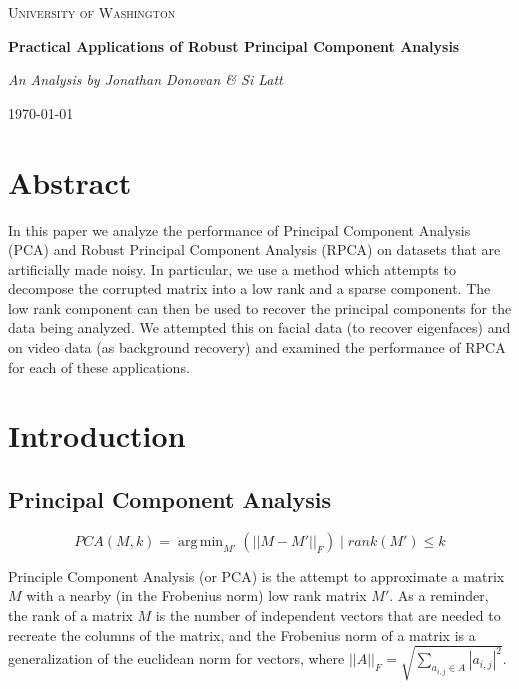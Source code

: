 \documentclass[11pt]{scrartcl} %
\DeclareMathOperator*{\argmin}{arg\,min}
\theoremstyle{plain}
\begin{document}
\begin{titlepage}
	\centering
	{\scshape\LARGE University of Washington\par}
	\vspace{1.5cm}
	{\huge\bfseries Practical Applications of Robust Principal Component Analysis\par}
	\vspace{2cm}
	{\Large\itshape  An Analysis by Jonathan Donovan \& Si Latt\par}

	\vfill

	{\large \today\par}
\end{titlepage}


\section{Abstract}
In this paper we analyze the performance of Principal Component Analysis (PCA) and Robust Principal Component Analysis (RPCA) on datasets that are artificially made noisy. In particular, we use a method\cite{pcp} which attempts to decompose the corrupted matrix into a low rank and a sparse component. The low rank component can then be used to recover the principal components for the data being analyzed. We attempted this on facial data (to recover eigenfaces) and on video data (as background recovery) and examined the performance of RPCA for each of these applications.

\section{Introduction}

\subsection{Principal Component Analysis}

\[ PCA(M, k) =\argmin_{M'}(||M-M'||_F ) \mid rank(M') \le k \]

Principle Component Analysis\cite{pca} (or PCA) is the attempt to approximate a matrix $M$ with a nearby (in the Frobenius norm) low rank matrix $M'$. As a reminder, the rank of a matrix $M$ is the number of independent vectors that are needed to recreate the columns of the matrix, and the Frobenius norm of a matrix is a generalization of the euclidean norm for vectors, where $||A||_F = \sqrt{\sum_{a_{i,j} \in A}|a_{i,j}|^2}$.
\end{document}
